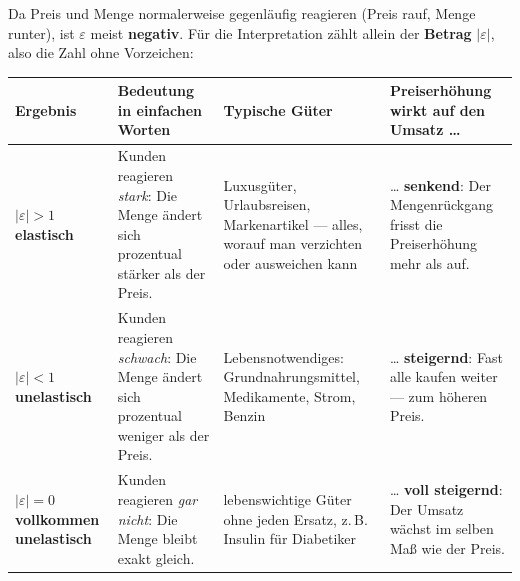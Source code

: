 \documentclass[11pt, a4paper]{article}
\begin{document}
Da Preis und Menge normalerweise gegenläufig reagieren (Preis rauf, Menge runter),
ist $\varepsilon$ meist \textbf{negativ}. Für die Interpretation zählt allein der
\textbf{Betrag} $|\varepsilon|$, also die Zahl ohne Vorzeichen:

\begin{center}
\small
\begin{tabular}{p{2.7cm} p{4.0cm} p{3.3cm} p{4.0cm}}
\toprule
\rowcolor{bfwTabHead}
\textbf{Ergebnis} & \textbf{Bedeutung in einfachen Worten} & \textbf{Typische Güter} & \textbf{Preiserhöhung wirkt auf den Umsatz \ldots}\\
\midrule
$|\varepsilon| > 1$ \newline \textbf{elastisch} &
  Kunden reagieren \emph{stark}: Die Menge ändert sich prozentual stärker als der Preis. &
  Luxusgüter, Urlaubsreisen, Markenartikel --- alles, worauf man verzichten oder ausweichen kann &
  \ldots{} \textbf{senkend}: Der Mengenrückgang frisst die Preiserhöhung mehr als auf.\\
\addlinespace
$|\varepsilon| < 1$ \newline \textbf{unelastisch} &
  Kunden reagieren \emph{schwach}: Die Menge ändert sich prozentual weniger als der Preis. &
  Lebensnotwendiges: Grundnahrungsmittel, Medikamente, Strom, Benzin &
  \ldots{} \textbf{steigernd}: Fast alle kaufen weiter --- zum höheren Preis.\\
\addlinespace
$|\varepsilon| = 0$ \newline \textbf{vollkommen unelastisch} &
  Kunden reagieren \emph{gar nicht}: Die Menge bleibt exakt gleich. &
  lebenswichtige Güter ohne jeden Ersatz, z.\,B. Insulin für Diabetiker &
  \ldots{} \textbf{voll steigernd}: Der Umsatz wächst im selben Maß wie der Preis.\\
\bottomrule
\end{tabular}
\end{center}
\end{document}
